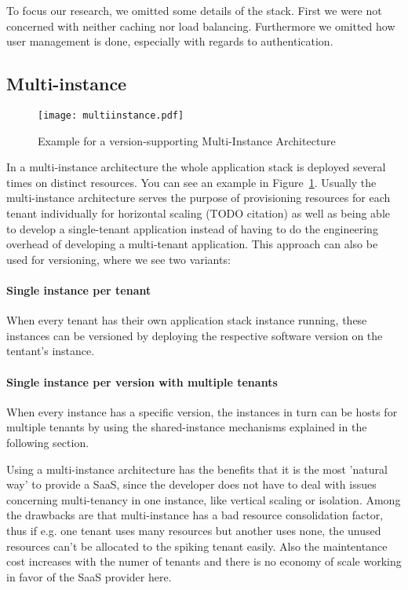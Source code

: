 To focus our research, we omitted some details of the stack. First we were not concerned with neither caching nor load balancing. Furthermore we omitted how user management is done, especially with regards to authentication.

\subsection{Multi-instance}

\begin{figure}
\centering
\texttt{[image: multiinstance.pdf]}
\caption{Example for a version-supporting Multi-Instance Architecture}
\label{fig:multiinstance}
\end{figure}

In a multi-instance architecture the whole application stack is deployed several times on distinct resources. You can see an example in Figure~\ref{fig:multiinstance}. Usually the multi-instance architecture serves the purpose of provisioning resources for each tenant individually for horizontal scaling (TODO citation) as well as being able to develop a single-tenant application instead of having to do the engineering overhead of developing a multi-tenant application. This approach can also be used for versioning, where we see two variants:

\paragraph{Single instance per tenant} When every tenant has their own application stack instance running, these instances can be versioned by deploying the respective software version on the tentant's instance.
\paragraph{Single instance per version with multiple tenants} When every instance has a specific version, the instances in turn can be hosts for multiple tenants by using the shared-instance mechanisms explained in the following section.

Using a multi-instance architecture has the benefits that it is the most 'natural way' to provide a SaaS, since the developer does not have to deal with issues concerning multi-tenancy in one instance, like vertical scaling or isolation. Among the drawbacks are that multi-instance has a bad resource consolidation factor, thus if e.g. one tenant uses many resources but another uses none, the unused resources can't be allocated to the spiking tenant easily. Also the maintentance cost increases with the numer of tenants and there is no economy of scale working in favor of the SaaS provider here.

